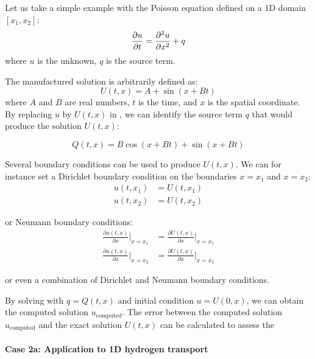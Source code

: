Let us take a simple example with the Poisson equation defined on a 1D domain $[x_1, x_2]$:
\begin{equation}
    \frac{\partial u}{\partial t} = \frac{\partial^2 u}{\partial x^2} + q
    \labeq{poisson eq demo mms}
\end{equation}
where $u$ is the unknown, $q$ is the source term.

The manufactured solution is arbitrarily defined as:
\begin{equation}
    U(t, x) = A + \sin{(x + B t)}
\end{equation}
where $A$ and $B$ are real numbers, $t$ is the time, and $x$ is the spatial coordinate.
By replacing $u$ by $U(t, x)$ in , we can identify the source term $q$ that would produce the solution $U(t, x)$:

\begin{equation}
    Q(t, x) = B \cos{(x + B t)} + \sin{(x + B t)}
\end{equation}

Several boundary conditions can be used to produce $U(t, x)$.
We can for instance set a Dirichlet boundary condition on the boundaries $x=x_1$ and $x=x_2$:
\begin{align}
    u(t, x_1) &= U(t, x_1) \\
    u(t, x_2) &= U(t, x_2)
\end{align}

or Neumann boundary conditions:
\begin{align}
    \frac{\partial u(t, x)}{\partial x}\Big | _{ x=x_1} &= \frac{\partial U(t, x)}{\partial x} \Big | _{ x=x_1} \\
    \frac{\partial u(t, x)}{\partial x}\Big | _{ x=x_2} &= \frac{\partial U(t, x)}{\partial x} \Big | _{ x=x_2}
\end{align}

or even a combination of Dirichlet and Neumann boundary conditions.

By solving  with $q = Q(t, x)$ and initial condition $u = U(0, x)$, we can obtain the computed solution $u_\mathrm{computed}$.
The error between the computed solution $u_\mathrm{computed}$ and the exact solution $U(t, x)$ can be calculated to assess the 

\paragraph{Case 2a: Application to 1D hydrogen transport}

